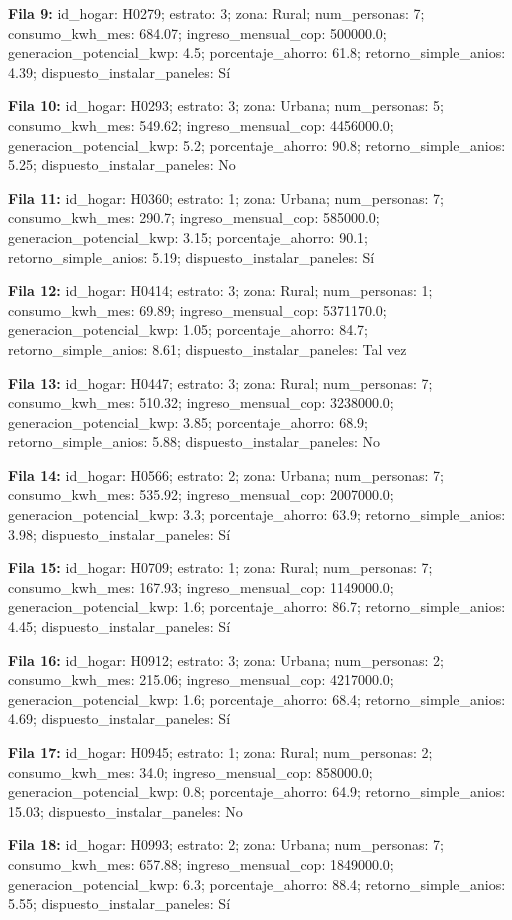 {\footnotesize\textbf{Fila 9:} id\_hogar: H0279; estrato: 3; zona: Rural; num\_personas: 7; consumo\_kwh\_mes: 684.07; ingreso\_mensual\_cop: 500000.0; generacion\_potencial\_kwp: 4.5; porcentaje\_ahorro: 61.8; retorno\_simple\_anios: 4.39; dispuesto\_instalar\_paneles: Sí\par}
{\footnotesize\textbf{Fila 10:} id\_hogar: H0293; estrato: 3; zona: Urbana; num\_personas: 5; consumo\_kwh\_mes: 549.62; ingreso\_mensual\_cop: 4456000.0; generacion\_potencial\_kwp: 5.2; porcentaje\_ahorro: 90.8; retorno\_simple\_anios: 5.25; dispuesto\_instalar\_paneles: No\par}
{\footnotesize\textbf{Fila 11:} id\_hogar: H0360; estrato: 1; zona: Urbana; num\_personas: 7; consumo\_kwh\_mes: 290.7; ingreso\_mensual\_cop: 585000.0; generacion\_potencial\_kwp: 3.15; porcentaje\_ahorro: 90.1; retorno\_simple\_anios: 5.19; dispuesto\_instalar\_paneles: Sí\par}
{\footnotesize\textbf{Fila 12:} id\_hogar: H0414; estrato: 3; zona: Rural; num\_personas: 1; consumo\_kwh\_mes: 69.89; ingreso\_mensual\_cop: 5371170.0; generacion\_potencial\_kwp: 1.05; porcentaje\_ahorro: 84.7; retorno\_simple\_anios: 8.61; dispuesto\_instalar\_paneles: Tal vez\par}
{\footnotesize\textbf{Fila 13:} id\_hogar: H0447; estrato: 3; zona: Rural; num\_personas: 7; consumo\_kwh\_mes: 510.32; ingreso\_mensual\_cop: 3238000.0; generacion\_potencial\_kwp: 3.85; porcentaje\_ahorro: 68.9; retorno\_simple\_anios: 5.88; dispuesto\_instalar\_paneles: No\par}
{\footnotesize\textbf{Fila 14:} id\_hogar: H0566; estrato: 2; zona: Urbana; num\_personas: 7; consumo\_kwh\_mes: 535.92; ingreso\_mensual\_cop: 2007000.0; generacion\_potencial\_kwp: 3.3; porcentaje\_ahorro: 63.9; retorno\_simple\_anios: 3.98; dispuesto\_instalar\_paneles: Sí\par}
{\footnotesize\textbf{Fila 15:} id\_hogar: H0709; estrato: 1; zona: Rural; num\_personas: 7; consumo\_kwh\_mes: 167.93; ingreso\_mensual\_cop: 1149000.0; generacion\_potencial\_kwp: 1.6; porcentaje\_ahorro: 86.7; retorno\_simple\_anios: 4.45; dispuesto\_instalar\_paneles: Sí\par}
{\footnotesize\textbf{Fila 16:} id\_hogar: H0912; estrato: 3; zona: Urbana; num\_personas: 2; consumo\_kwh\_mes: 215.06; ingreso\_mensual\_cop: 4217000.0; generacion\_potencial\_kwp: 1.6; porcentaje\_ahorro: 68.4; retorno\_simple\_anios: 4.69; dispuesto\_instalar\_paneles: Sí\par}
{\footnotesize\textbf{Fila 17:} id\_hogar: H0945; estrato: 1; zona: Rural; num\_personas: 2; consumo\_kwh\_mes: 34.0; ingreso\_mensual\_cop: 858000.0; generacion\_potencial\_kwp: 0.8; porcentaje\_ahorro: 64.9; retorno\_simple\_anios: 15.03; dispuesto\_instalar\_paneles: No\par}
{\footnotesize\textbf{Fila 18:} id\_hogar: H0993; estrato: 2; zona: Urbana; num\_personas: 7; consumo\_kwh\_mes: 657.88; ingreso\_mensual\_cop: 1849000.0; generacion\_potencial\_kwp: 6.3; porcentaje\_ahorro: 88.4; retorno\_simple\_anios: 5.55; dispuesto\_instalar\_paneles: Sí\par}
